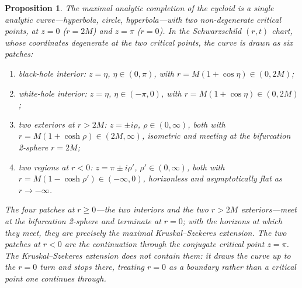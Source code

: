 \documentclass[11pt,a4paper]{article}
\newtheorem{proposition}[theorem]{Proposition}
\theoremstyle{definition}
\begin{document}
\begin{proposition}\label{prop:four_regions}
The maximal analytic completion of the cycloid is a single analytic curve---hyperbola, circle, hyperbola---with two non-degenerate critical points, at $z=0$ ($r=2M$) and $z=\pi$ ($r=0$). In the Schwarzschild $(r,t)$ chart, whose coordinates degenerate at the two critical points, the curve is drawn as six patches:
\begin{enumerate}
\item black-hole interior: $z = \eta$, $\eta \in (0, \pi)$, with $r = M(1+\cos\eta) \in (0, 2M)$;
\item white-hole interior: $z = \eta$, $\eta \in (-\pi, 0)$, with $r = M(1+\cos\eta) \in (0, 2M)$;
\item two exteriors at $r>2M$: $z = \pm i\rho$, $\rho \in (0, \infty)$, both with $r = M(1+\cosh\rho) \in (2M, \infty)$, isometric and meeting at the bifurcation 2-sphere $r=2M$;
\item two regions at $r<0$: $z = \pi \pm i\rho'$, $\rho' \in (0, \infty)$, both with $r = M(1-\cosh\rho') \in (-\infty, 0)$, horizonless and asymptotically flat as $r \to -\infty$.
\end{enumerate}
The four patches at $r \geq 0$---the two interiors and the two $r>2M$ exteriors---meet at the bifurcation 2-sphere and terminate at $r=0$; with the horizons at which they meet, they are precisely the maximal Kruskal--Szekeres extension. The two patches at $r<0$ are the continuation through the conjugate critical point $z=\pi$. The Kruskal--Szekeres extension does not contain them: it draws the curve up to the $r=0$ turn and stops there, treating $r=0$ as a boundary rather than a critical point one continues through.
\end{proposition}
\end{document}
